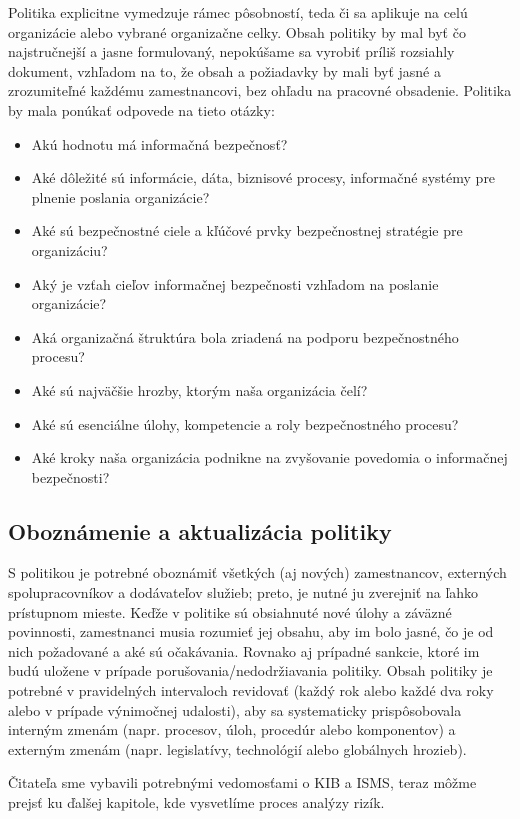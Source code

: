 Politika explicitne vymedzuje rámec pôsobností, teda či sa aplikuje na celú organizácie alebo vybrané organizačne celky. Obsah politiky
by mal byť čo najstručnejší a jasne formulovaný, nepokúšame sa vyrobiť príliš rozsiahly dokument, vzhľadom na to, že obsah
a požiadavky by mali byť jasné a zrozumiteľné každému zamestnancovi, bez ohľadu na pracovné obsadenie. Politika by mala ponúkať
odpovede na tieto otázky:
\begin{itemize}[nosep]
        \item Akú hodnotu má informačná bezpečnosť?
        \item Aké dôležité sú informácie, dáta, biznisové procesy, informačné systémy pre plnenie poslania organizácie?
        \item Aké sú bezpečnostné ciele a kľúčové prvky bezpečnostnej stratégie pre organizáciu?
        \item Aký je vzťah cieľov informačnej bezpečnosti vzhľadom na poslanie organizácie?
        \item Aká organizačná štruktúra bola zriadená na podporu bezpečnostného procesu?
        \item Aké sú najväčšie hrozby, ktorým naša organizácia čelí?
        \item Aké sú esenciálne úlohy, kompetencie a roly bezpečnostného procesu?
        \item Aké kroky naša organizácia podnikne na zvyšovanie povedomia o informačnej bezpečnosti?
\end{itemize}

\subsection*{Oboznámenie a aktualizácia politiky}

S politikou je potrebné oboznámiť všetkých (aj nových) zamestnancov, externých spolupracovníkov a dodávateľov služieb; preto,
je nutné ju zverejniť na ľahko prístupnom mieste.
Keďže v politike sú obsiahnuté nové úlohy a záväzné povinnosti, zamestnanci musia rozumieť jej obsahu, aby im bolo jasné, čo je od nich
požadované a aké sú očakávania. Rovnako aj prípadné sankcie, ktoré im budú uložene v prípade porušovania/nedodržiavania politiky.
Obsah politiky je potrebné v pravidelných intervaloch revidovať (každý rok alebo každé dva roky alebo v prípade výnimočnej udalosti),
aby sa systematicky prispôsobovala interným zmenám (napr. procesov, úloh, procedúr alebo komponentov) a externým zmenám (napr. legislatívy,
technológií alebo globálnych hrozieb).

Čitateľa sme vybavili potrebnými vedomosťami o KIB a ISMS, teraz môžme prejsť ku ďalšej kapitole, kde vysvetlíme proces analýzy rizík.
